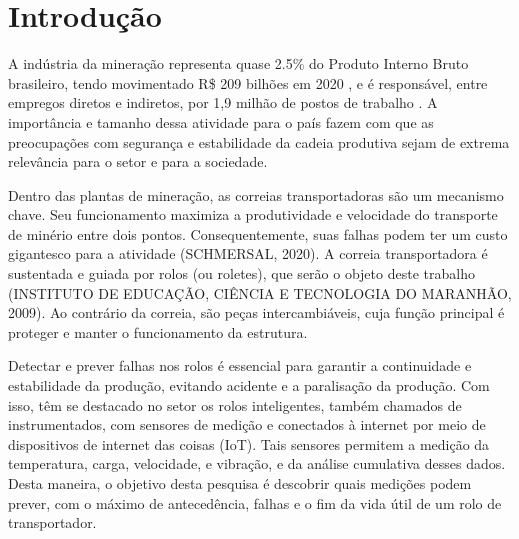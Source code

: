 
\chapter[Introdução]{Introdução}

A indústria da mineração representa quase 2.5\% do Produto Interno Bruto brasileiro, tendo movimentado R\$ 209 bilhões em 2020 \cite{governo2021}, e é responsável, entre empregos diretos e indiretos, por 1,9 milhão de postos de trabalho \cite{instituto2020}. A importância e tamanho dessa atividade para o país fazem com que as preocupações com segurança e estabilidade da cadeia produtiva sejam de extrema relevância para o setor e para a sociedade.\par
Dentro das plantas de mineração, as correias transportadoras são um mecanismo chave. Seu funcionamento maximiza a produtividade e velocidade do transporte de minério entre dois pontos. Consequentemente, suas falhas podem ter um custo gigantesco para a atividade (SCHMERSAL, 2020). A correia transportadora é sustentada e guiada por rolos (ou roletes), que serão o objeto deste trabalho (INSTITUTO DE EDUCAÇÃO, CIÊNCIA E TECNOLOGIA DO MARANHÃO, 2009). Ao contrário da correia, são peças intercambiáveis, cuja função principal é proteger e manter o funcionamento da estrutura.\par

Detectar e prever falhas nos rolos é essencial para garantir a continuidade e estabilidade da produção, evitando acidente e a paralisação da produção. Com isso, têm se destacado no setor os rolos inteligentes, também chamados de instrumentados, com sensores de medição e conectados à internet por meio de dispositivos de internet das coisas (IoT). Tais sensores permitem a medição da temperatura, carga, velocidade, e vibração, e da análise cumulativa desses dados. Desta maneira, o objetivo desta pesquisa é descobrir quais medições podem prever, com o máximo de antecedência, falhas e o fim da vida útil de um rolo de transportador.


	
	
